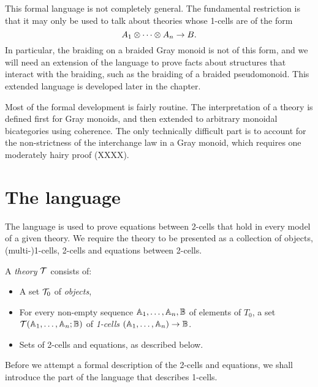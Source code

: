 \documentclass{robinthesisdraft}
\begin{document}
This formal language is not completely general. The fundamental
restriction is that it may only be used to talk about theories
whose 1-cells are of the form
\[
	A_{1}\tn\cdots\tn A_{n} \to B.
\]
In particular, the braiding on a braided Gray monoid is not of this
form, and we will need an extension of the language to prove facts about
structures that interact with the braiding, such as the braiding of
a braided pseudomonoid. This extended language is developed later in
the chapter.

Most of the formal development is fairly routine. The interpretation of
a theory is defined first for Gray monoids, and then extended to arbitrary
monoidal bicategories using coherence. The only technically difficult part
is to account for the non-strictness of the interchange law in a Gray monoid,
which requires one moderately hairy proof (XXXX).

\section{The language}
The language is used to prove equations between 2-cells that hold in
every model of a given theory.
%
We require the theory to be presented as a collection
of objects, (multi-)1-cells, 2-cells and equations between 2-cells.

A \emph{theory} ${\mathcal{T}}$ consists of:
\begin{itemize}
	\item A set ${\mathcal{T}}_{0}$ of \emph{objects},
	\item For every non-empty sequence $\mathbb{A}_{1}, \ldots, \mathbb{A}_{n}, \mathbb{B}$ of
		elements of $T_{0}$,
		a set ${\mathcal{T}}(\mathbb{A}_{1},\ldots,\mathbb{A}_{n};\mathbb{B})$
		of \emph{1-cells} $(\mathbb{A}_{1}, \dots, \mathbb{A}_{n})\to \mathbb{B}$.
	\item Sets of 2-cells and equations, as described below.
\end{itemize}
Before we attempt a formal description of the 2-cells and equations,
we shall introduce the part of the language that describes 1-cells.
\end{document}
